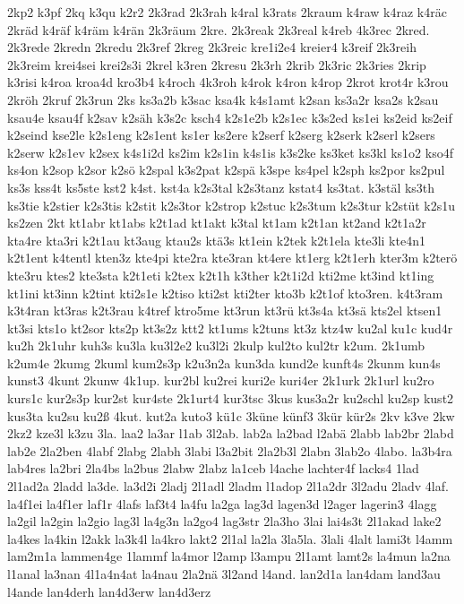 {2kp2
k3pf
2kq
k3qu
k2r2
2k3rad
2k3rah
k4ral
k3rats
2kraum
k4raw
k4raz
k4räc
2kräd
k4räf
k4räm
k4rän
2k3räum
2kre.
2k3reak
2k3real
k4reb
4k3rec
2kred.
2k3rede
2kredn
2kredu
2k3ref
2kreg
2k3reic
kre1i2e4
kreier4
k3reif
2k3reih
2k3reim
krei4sei
krei2s3i
2krel
k3ren
2kresu
2k3rh
2krib
2k3ric
2k3ries
2krip
k3risi
k4roa
kroa4d
kro3b4
k4roch
4k3roh
k4rok
k4ron
k4rop
2krot
krot4r
k3rou
2kröh
2kruf
2k3run
2ks
ks3a2b
k3sac
ksa4k
k4s1amt
k2san
ks3a2r
ksa2s
k2sau
ksau4e
ksau4f
k2sav
k2säh
k3s2c
ksch4
k2s1e2b
k2s1ec
k3s2ed
ks1ei
ks2eid
ks2eif
k2seind
kse2le
k2s1eng
k2s1ent
ks1er
ks2ere
k2serf
k2serg
k2serk
k2serl
k2sers
k2serw
k2s1ev
k2sex
k4s1i2d
ks2im
k2s1in
k4s1is
k3s2ke
ks3ket
ks3kl
ks1o2
kso4f
ks4on
k2sop
k2sor
k2sö
k2spal
k3s2pat
k2spä
k3spe
ks4pel
k2sph
ks2por
ks2pul
ks3s
kss4t
ks5ste
kst2
k4st.
kst4a
k2s3tal
k2s3tanz
kstat4
ks3tat.
k3stäl
ks3th
ks3tie
k2stier
k2s3tis
k2stit
k2s3tor
k2strop
k2stuc
k2s3tum
k2s3tur
k2stüt
k2s1u
ks2zen
2kt
kt1abr
kt1abs
k2t1ad
kt1akt
k3tal
kt1am
k2t1an
kt2and
k2t1a2r
kta4re
kta3ri
k2t1au
kt3aug
ktau2s
ktä3s
kt1ein
k2tek
k2t1ela
kte3li
kte4n1
k2t1ent
k4tentl
kten3z
kte4pi
kte2ra
kte3ran
kt4ere
kt1erg
k2t1erh
kter3m
k2terö
kte3ru
ktes2
kte3sta
k2t1eti
k2tex
k2t1h
k3ther
k2t1i2d
kti2me
kt3ind
kt1ing
kt1ini
kt3inn
k2tint
kti2s1e
k2tiso
kti2st
kti2ter
kto3b
k2t1of
kto3ren.
k4t3ram
k3t4ran
kt3ras
k2t3rau
k4tref
ktro5me
kt3run
kt3rü
kt3s4a
kt3sä
kts2el
ktsen1
kt3si
kts1o
kt2sor
kts2p
kt3s2z
ktt2
kt1ums
k2tuns
kt3z
ktz4w
ku2al
ku1c
kud4r
ku2h
2k1uhr
kuh3s
ku3la
ku3l2e2
ku3l2i
2kulp
kul2to
kul2tr
k2um.
2k1umb
k2um4e
2kumg
2kuml
kum2s3p
k2u3n2a
kun3da
kund2e
kunft4s
2kunm
kun4s
kunst3
4kunt
2kunw
4k1up.
kur2bl
ku2rei
kuri2e
kuri4er
2k1urk
2k1url
ku2ro
kurs1c
kur2s3p
kur2st
kur4ste
2k1urt4
kur3tsc
3kus
kus3a2r
ku2schl
ku2sp
kust2
kus3ta
ku2su
ku2ß
4kut.
kut2a
kuto3
kü1c
3küne
künf3
3kür
kür2s
2kv
k3ve
2kw
2kz2
kze3l
k3zu
3la.
laa2
la3ar
l1ab
3l2ab.
lab2a
la2bad
l2abä
2labb
lab2br
2labd
lab2e
2la2ben
4labf
2labg
2labh
3labi
l3a2bit
2la2b3l
2labn
3lab2o
4labo.
la3b4ra
lab4res
la2bri
2la4bs
la2bus
2labw
2labz
la1ceb
l4ache
lachter4f
lacks4
1lad
2l1ad2a
2ladd
la3de.
la3d2i
2ladj
2l1adl
2ladm
l1adop
2l1a2dr
3l2adu
2ladv
4laf.
la4f1ei
la4f1er
laf1r
4lafs
laf3t4
la4fu
la2ga
lag3d
lagen3d
l2ager
lagerin3
4lagg
la2gil
la2gin
la2gio
lag3l
la4g3n
la2go4
lag3str
2la3ho
3lai
lai4s3t
2l1akad
lake2
la4kes
la4kin
l2akk
la3k4l
la4kro
lakt2
2l1al
la2la
3la5la.
3lali
4lalt
lami3t
l4amm
lam2m1a
lammen4ge
1lammf
la4mor
l2amp
l3ampu
2l1amt
lamt2s
la4mun
la2na
l1anal
la3nan
4l1a4n4at
la4nau
2la2nä
3l2and
l4and.
lan2d1a
lan4dam
land3au
l4ande
lan4derh
lan4d3erw
lan4d3erz
}
